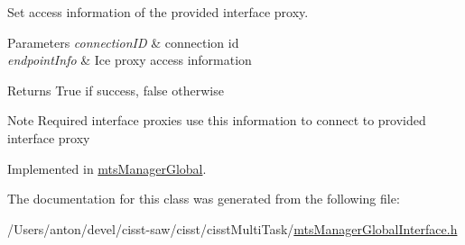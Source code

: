 Set access information of the provided interface proxy. 


\begin{DoxyParams}{Parameters}
{\em connection\+I\+D} & connection id \\
\hline
{\em endpoint\+Info} & Ice proxy access information \\
\hline
\end{DoxyParams}
\begin{DoxyReturn}{Returns}
True if success, false otherwise 
\end{DoxyReturn}
\begin{DoxyNote}{Note}
Required interface proxies use this information to connect to provided interface proxy 
\end{DoxyNote}


Implemented in \hyperlink{classmts_manager_global_a27ab6be87f292f862b05551bf786bcfd}{mts\+Manager\+Global}.



The documentation for this class was generated from the following file\+:\begin{DoxyCompactItemize}
\item 
/\+Users/anton/devel/cisst-\/saw/cisst/cisst\+Multi\+Task/\hyperlink{mts_manager_global_interface_8h}{mts\+Manager\+Global\+Interface.\+h}\end{DoxyCompactItemize}
